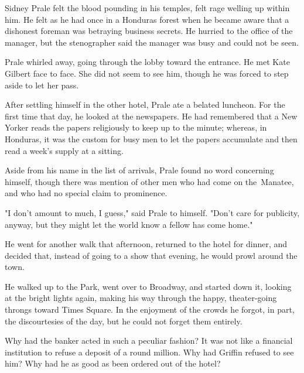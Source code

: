 \documentclass{novel}
\begin{document}
Sidney Prale felt the blood pounding in his temples, felt rage welling up within him. He felt as he had once in a Honduras forest when he became aware that a dishonest foreman was betraying business secrets. He hurried to the office of the manager, but the stenographer said the manager was busy and could not be seen.

Prale whirled away, going through the lobby toward the entrance. He met Kate Gilbert face to face. She did not seem to see him, though he was forced to step aside to let her pass.

\vspace{2\nbs}
\clearpage
\thispagestyle{empty}

\begin{ChapterStart}
\vspace{3\nbs}
\end{ChapterStart}
    
After settling himself in the other hotel, Prale ate a belated luncheon. For the first time that day, he looked at the newspapers. He had remembered that a New Yorker reads the papers religiously to keep up to the minute; whereas, in Honduras, it was the custom for busy men to let the papers accumulate and then read a week's supply at a sitting.

Aside from his name in the list of arrivals, Prale found no word concerning himself, though there was mention of other men who had come on the Manatee, and who had no special claim to prominence.

"I don't amount to much, I guess," said Prale to himself. "Don't care for publicity, anyway, but they might let the world know a fellow has come home."

He went for another walk that afternoon, returned to the hotel for dinner, and decided that, instead of going to a show that evening, he would prowl around the town.

He walked up to the Park, went over to Broadway, and started down it, looking at the bright lights again, making his way through the happy, theater-going throngs toward Times Square. In the enjoyment of the crowds he forgot, in part, the discourtesies of the day, but he could not forget them entirely.

Why had the banker acted in such a peculiar fashion? It was not like a financial institution to refuse a deposit of a round million. Why had Griffin refused to see him? Why had he as good as been ordered out of the hotel?
\end{document}
